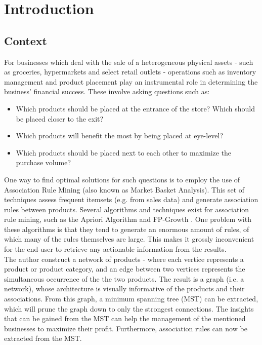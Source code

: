 \documentclass[a4paper,11pt]{article}
\begin{document}
\newpage
\tableofcontents

\newpage
\section{Introduction}
\subsection{Context}
For businesses which deal with the sale of a heterogeneous physical assets - such as groceries, hypermarkets and select retail outlets - operations such as inventory management and product placement play an instrumental role in determining the business' financial success. These involve asking questions such as:
\begin{itemize}
\item Which products should be placed at the entrance of the store? Which should be placed closer to the exit?
\item Which products will benefit the most by being placed at eye-level?
\item Which products should be placed next to each other to maximize the purchase volume?
\end{itemize}
One way to find optimal solutions for such questions is to employ the use of Association Rule Mining (also known as Market Basket Analysis). This set of techniques assess frequent itemsets (e.g. from sales data) and generate association rules between products. Several algorithms and techniques exist for association rule mining, such as the Apriori Algorithm and FP-Growth \cite{fp_growth}. One problem with these algorithms is that they tend to generate an enormous amount of rules, of which many of the rules themselves are large. This makes it grossly inconvenient for the end-user to retrieve any actionable information from the results.\\
The author construct a network of products - where each vertice represents a product or product category, and an edge between two vertices represents the simultaneous occurrence of the the two products. The result is a graph (i.e. a network), whose architecture is visually informative of the products and their associations.  From this graph, a minimum spanning tree (MST) can be extracted, which will prune the graph down to only the strongest connections. The insights that can be gained from the MST can help the management of the mentioned businesses to maximize their profit.  Furthermore,  association rules can now be extracted from the MST.
\end{document}
